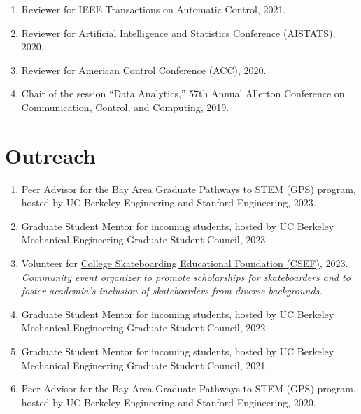 \documentclass[11pt]{article}
\begin{document}
\begin{enumerate}[label={\arabic*.}]
		\item Reviewer for IEEE Transactions on Automatic Control, 2021.
		\item Reviewer for Artificial Intelligence and Statistics Conference (AISTATS), 2020.
		\item Reviewer for American Control Conference (ACC), 2020.
		\item Chair of the session ``Data Analytics,'' 57th Annual Allerton Conference on Communication, Control, and Computing, 2019.
	\end{enumerate}
	
	\section{Outreach}
	\begin{enumerate}[label={\arabic*.}]
		\item Peer Advisor for the Bay Area Graduate Pathways to STEM (GPS) program, hosted by UC Berkeley Engineering and Stanford Engineering, 2023.
		\item Graduate Student Mentor for incoming students, hosted by UC Berkeley Mechanical Engineering Graduate Student Council, 2023.
		\item Volunteer for \href{https://www.collegeskateboarding.com/}{College Skateboarding Educational Foundation (CSEF)}, 2023. \\
		\textit{Community event organizer to promote scholarships for skateboarders and to foster academia's inclusion of skateboarders from diverse backgrounds.}
		\item Graduate Student Mentor for incoming students, hosted by UC Berkeley Mechanical Engineering Graduate Student Council, 2022.
		\item Graduate Student Mentor for incoming students, hosted by UC Berkeley Mechanical Engineering Graduate Student Council, 2021.
		\item Peer Advisor for the Bay Area Graduate Pathways to STEM (GPS) program, hosted by UC Berkeley Engineering and Stanford Engineering, 2020.
	\end{enumerate}
	
\end{document}
